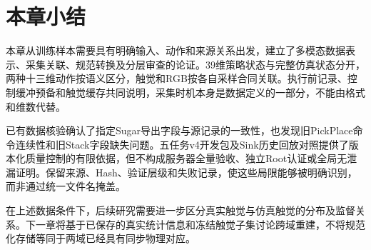 \section{本章小结}
\label{sec:data_quality_summary}

本章从训练样本需要具有明确输入、动作和来源关系出发，建立了多模态数据表示、采集关联、规范转换及分层审查的论证。39维策略状态与完整仿真状态分开，两种十三维动作按语义区分，触觉和RGB按各自采样合同关联。执行前记录、控制缓冲预备和触觉缓存共同说明，采集时机本身是数据定义的一部分，不能由格式和维数代替。

已有数据核验确认了指定Sugar导出字段与源记录的一致性，也发现旧PickPlace命令连续性和旧Stack字段缺失问题。五任务v4开发包及Sink历史回放对照提供了版本化质量控制的有限依据，但不构成服务器全量验收、独立Root认证或全局无泄漏证明。保留来源、Hash、验证层级和失败记录，使这些局限能够被明确识别，而非通过统一文件名掩盖。

在上述数据条件下，后续研究需要进一步区分真实触觉与仿真触觉的分布及监督关系。下一章将基于已保存的真实统计信息和冻结触觉子集讨论跨域重建，不将规范化存储等同于两域已经具有同步物理对应。
